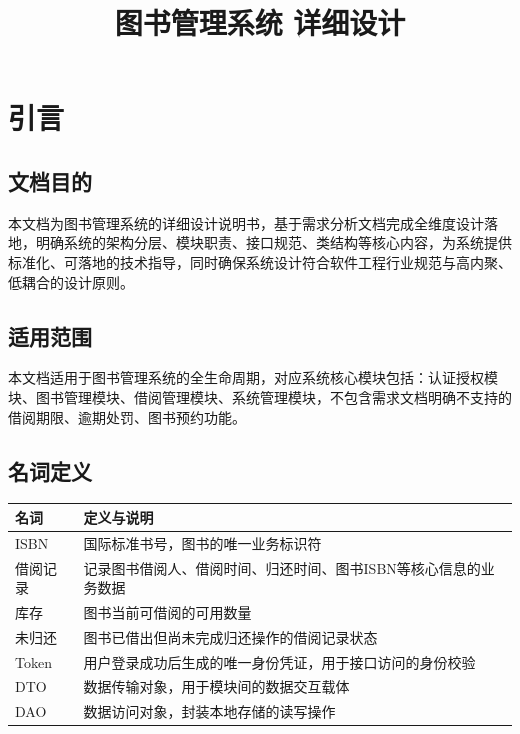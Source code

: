 \documentclass[12pt, a4paper]{article}
\title{\textbf{\Large 图书管理系统 详细设计}}
\author{}
\date{}
\begin{document}
\newpage
\maketitle
\newpage
\tableofcontents
\newpage

\section{引言}

\subsection{文档目的}

本文档为图书管理系统的详细设计说明书，基于需求分析文档完成全维度设计落地，明确系统的架构分层、模块职责、接口规范、类结构等核心内容，为系统提供标准化、可落地的技术指导，同时确保系统设计符合软件工程行业规范与高内聚、低耦合的设计原则。

\subsection{适用范围}

本文档适用于图书管理系统的全生命周期，对应系统核心模块包括：认证授权模块、图书管理模块、借阅管理模块、系统管理模块，不包含需求文档明确不支持的借阅期限、逾期处罚、图书预约功能。

\subsection{名词定义}

\begin{table}[H]
    \centering
    \begin{tabular}{|l|l|}
        \hline
        名词 & 定义与说明 \\
        \hline
        ISBN & 国际标准书号，图书的唯一业务标识符 \\
        \hline
        借阅记录 & 记录图书借阅人、借阅时间、归还时间、图书ISBN等核心信息的业务数据 \\
        \hline
        库存 & 图书当前可借阅的可用数量 \\
        \hline
        未归还 & 图书已借出但尚未完成归还操作的借阅记录状态 \\
        \hline
        Token & 用户登录成功后生成的唯一身份凭证，用于接口访问的身份校验 \\
        \hline
        DTO & 数据传输对象，用于模块间的数据交互载体 \\
        \hline
        DAO & 数据访问对象，封装本地存储的读写操作 \\
        \hline
    \end{tabular}
\end{table}
\end{document}
